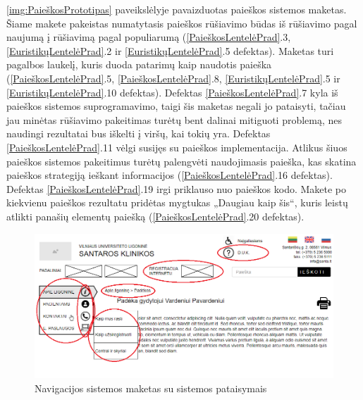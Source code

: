 \documentclass{VUMIFPSkursinis}
\begin{document}
\ref{img:PaieškosPrototipas} paveikslėlyje pavaizduotas paieškos sistemos maketas. Šiame makete pakeistas numatytasis paieškos rūšiavimo būdas iš rūšiavimo pagal naujumą į rūšiavimą pagal populiarumą (\ref{PaieškosLentelėPrad}.3, \ref{EuristikųLentelėPrad}.2 ir \ref{EuristikųLentelėPrad}.5 defektas). Maketas turi pagalbos laukelį, kuris duoda patarimų kaip naudotis paieška (\ref{PaieškosLentelėPrad}.5, \ref{PaieškosLentelėPrad}.8, \ref{EuristikųLentelėPrad}.5  ir \ref{EuristikųLentelėPrad}.10 defektas). Defektas \ref{PaieškosLentelėPrad}.7 kyla iš paieškos sistemos suprogramavimo, taigi šis maketas negali jo pataisyti, tačiau jau minėtas rūšiavimo pakeitimas turėtų bent dalinai mitiguoti problemą, nes naudingi rezultatai bus iškelti į viršų, kai tokių yra. Defektas \ref{PaieškosLentelėPrad}.11 vėlgi susijęs su paieškos implementacija. Atlikus šiuos paieškos sistemos pakeitimus turėtų palengvėti naudojimasis paieška, kas skatina paieškos strategiją ieškant informacijos (\ref{PaieškosLentelėPrad}.16 defektas). Defektas \ref{PaieškosLentelėPrad}.19 irgi priklauso nuo paieškos kodo. Makete po kiekvienu paieškos rezultatu pridėtas mygtukas „Daugiau kaip šis“, kuris leistų atlikti panašių elementų paiešką (\ref{PaieškosLentelėPrad}.20 defektas).


\begin{figure}[H]
    \centering
    \includegraphics[scale=0.65]{img/NavigacijosPrototipas}
    \caption{Navigacijos sistemos maketas su sistemos pataisymais}
    \label{img:NavigacijosPrototipas}
\end{figure}
\end{document}
